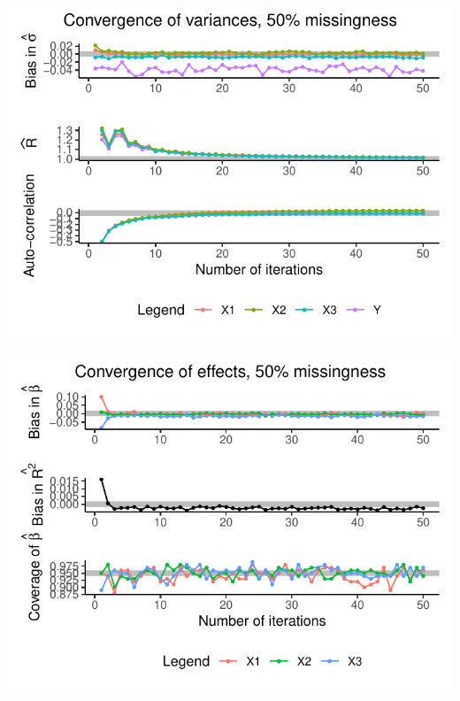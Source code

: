 \documentclass[Royal,times,sageh]{sagej}
\begin{document}
\begin{flushleft}\includegraphics{manuscript_files/figure-latex/unnamed-chunk-8-1} \end{flushleft}

\begin{flushleft}\includegraphics{manuscript_files/figure-latex/unnamed-chunk-9-1} \end{flushleft}
\end{document}
